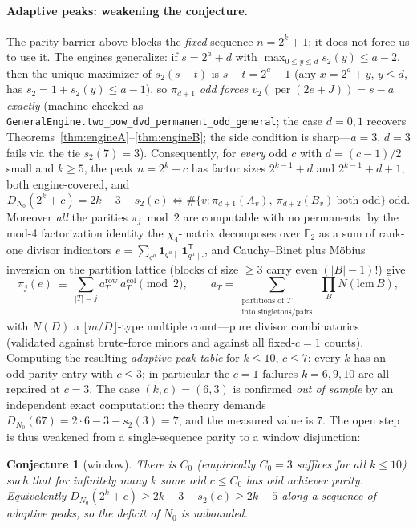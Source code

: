 \documentclass[11pt]{article}
\newtheorem{conjecture}[theorem]{Conjecture}
\theoremstyle{remark}\newtheorem{remark}[theorem]{Remark}
\DeclareMathOperator{\perm}{per}
\begin{document}
\paragraph{Adaptive peaks: weakening the conjecture.} The parity barrier above blocks the \emph{fixed}
sequence $n=2^k+1$; it does not force us to use it. The engines generalize: if $s=2^a+d$ with
$\max_{0\le y\le d}s_2(y)\le a-2$, then the unique maximizer of $s_2(s-t)$ is $s-t=2^a-1$ (any
$x=2^a+y$, $y\le d$, has $s_2=1+s_2(y)\le a-1$), so \emph{$\pi_{d+1}$ odd forces
$v_2(\perm(2e+J))=s-a$ exactly} (machine-checked as
\texttt{GeneralEngine.two\_pow\_dvd\_permanent\_odd\_general}; the case $d=0,1$ recovers
Theorems~\ref{thm:engineA}--\ref{thm:engineB}; the side condition is sharp---$a=3$, $d=3$ fails via the
tie $s_2(7)=3$). Consequently, for \emph{every} odd $c$ with $d=(c-1)/2$ small and $k\ge5$, the peak
$n=2^k+c$ has factor sizes $2^{k-1}+d$ and $2^{k-1}+d+1$, both engine-covered, and
\[
   D_{N_0}(2^k+c)=2k-3-s_2(c)
   \iff
   \#\{v:\pi_{d+1}(A_v),\ \pi_{d+2}(B_v)\ \text{both odd}\}\ \text{odd}.
\]
Moreover \emph{all} the parities $\pi_j\bmod2$ are computable with no permanents: by the mod-4
factorization identity the $\chi_4$-matrix decomposes over $\mathbb F_2$ as a sum of rank-one divisor
indicators $e=\sum_{q^a}\mathbf1_{q^a\mid\cdot}\mathbf1_{q^a\mid\cdot}^{\mathsf T}$, and Cauchy--Binet
plus M\"obius inversion on the partition lattice (blocks of size $\ge3$ carry even $(|B|-1)!$) give
\[
   \pi_j(e)\ \equiv\ \sum_{|T|=j}a_T^{\mathrm{row}}\,a_T^{\mathrm{col}}\pmod2,\qquad
   a_T=\!\!\sum_{\substack{\text{partitions of }T\\ \text{into singletons/pairs}}}\ \prod_B
   N(\mathrm{lcm}\,B),
\]
with $N(D)$ a $\lfloor m/D\rfloor$-type multiple count---pure divisor combinatorics (validated against
brute-force minors and against all fixed-$c{=}1$ counts). Computing the resulting \emph{adaptive-peak
table} for $k\le10$, $c\le7$: every $k$ has an odd-parity entry with $c\le3$; in particular the
$c{=}1$ failures $k=6,9,10$ are all repaired at $c=3$. The case $(k,c)=(6,3)$ is confirmed
\emph{out of sample} by an independent exact computation: the theory demands
$D_{N_0}(67)=2\cdot6-3-s_2(3)=7$, and the measured value is $7$. The open step is thus weakened from a
single-sequence parity to a window disjunction:

\begin{conjecture}[window]\label{conj:window}
There is $C_0$ (empirically $C_0=3$ suffices for all $k\le10$) such that for infinitely many $k$ some
odd $c\le C_0$ has odd achiever parity. Equivalently $D_{N_0}(2^k+c)\ge2k-3-s_2(c)\ge 2k-5$ along a
sequence of adaptive peaks, so the deficit of $N_0$ is unbounded.
\end{conjecture}
\end{document}
